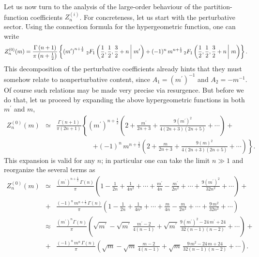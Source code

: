 \documentclass[11pt,a4paper]{article}
\newcommand{\be}{\begin{equation}}
\newcommand{\ee}{\end{equation}}
\begin{document}
Let us now turn to the analysis of the large-order behaviour of the partition-function coefficients $Z^{(i)}_n$. For concreteness, let us start with the perturbative sector.  Using the connection formula for the hypergeometric function, one can write 
%
\be
\label{eq:linear-ell-lo}
Z^{(0)}_n (m) = \frac{\Gamma\left(n+1\right)}{\pi \left( n+\frac{1}{2} \right)} \left\{ \left( m^\prime \right)^{n+\frac{1}{2}}\, {}_2F_{1} \left( \frac{1}{2}, \frac{1}{2}, \frac{3}{2}+n\, \right| \left. \vphantom{\frac{1}{2}} m^\prime \right) + (-1)^n\, m^{n+\frac{1}{2}}\, {}_2F_{1} \left( \frac{1}{2}, \frac{1}{2}, \frac{3}{2}+n\, \right| \left. \vphantom{\frac{1}{2}} m \right) \right\}. 
\ee
%
\noindent
This decomposition of the perturbative coefficients already hints that they must somehow relate to nonperturbative content, since $A_1 = \left( m^\prime \right)^{-1}$ and $A_2 = - m^{-1}$. Of course such relations may be made very precise via resurgence. But before we do that, let us proceed by expanding the above hypergeometric functions in both $m^{\prime}$ and $m$,
%
\begin{eqnarray}
\label{ell_pertecomp}
Z^{(0)}_n (m) &\simeq& \frac{\Gamma\left(n+1\right)}{\pi \left( 2n+1 \right)} \left\{ \left(m^\prime\right)^{n+\frac{1}{2}} \left( 2 + \frac{m^\prime}{2n+3} +\frac{9 \left( m^\prime \right)^2}{4 \left( 2n+3 \right) \left( 2n+5 \right)} + \cdots \right) + \right. \\
&&
\hspace{65pt}
\left. + (-1)^n\, m^{n+\frac{1}{2}} \left( 2 + \frac{m}{2n+3} + \frac{9 \left( m \right)^2}{4 \left( 2n+3 \right) \left( 2n+5 \right)} + \cdots \right) \right\}. \nonumber
\end{eqnarray} 
%
\noindent
This expansion is valid for any $n$; in particular one can take the limit $n\gg1$ and reorganize the several terms as
%
\begin{eqnarray}
Z^{(0)}_n (m) &\simeq& \frac{\left( m^\prime \right)^{n+\frac{1}{2}}\, \Gamma\left(n\right)}{\pi} \left( 1 - \frac{1}{2n} + \frac{1}{4n^2} + \cdots + \frac{m^\prime}{4n} - \frac{m^\prime}{2n^2} + \cdots + \frac{9 \left(m^\prime\right)^2}{32n^2} + \cdots \right) + \nonumber \\
&+& \frac{(-1)^n\, m^{n+\frac{1}{2}}\, \Gamma\left(n\right)}{\pi} \left( 1 - \frac{1}{2n} + \frac{1}{4n^2} + \cdots + \frac{m}{4n} - \frac{m}{2n^2} + \cdots + \frac{9\, m^2}{32n^2} + \cdots \right) \\
&\approx& \frac{\left( m^\prime \right)^{n} \Gamma\left(n\right)}{\pi} \left( \sqrt{m^\prime} - \sqrt{m^\prime}\, \frac{m^\prime-2}{4 \left(n-1\right)} + \sqrt{m^\prime}\, \frac{9 \left(m^\prime\right)^2 - 24\, m^\prime + 24}{32 \left(n-1\right) \left(n-2\right)} + \cdots \right) + \nonumber \\
&+& \frac{(-1)^n\, m^{n}\, \Gamma\left(n\right)}{\pi} \left( \sqrt{m} - \sqrt{m}\, \frac{m-2}{4 \left(n-1\right)} + \sqrt{m}\, \frac{9\, m^2 - 24\, m + 24}{32 \left(n-1\right) \left(n-2\right)} + \cdots \right).
\end{eqnarray} 
\end{document}
